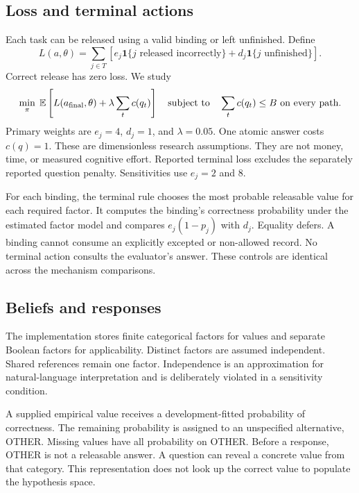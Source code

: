 \documentclass[11pt]{article}
\begin{document}
\subsection{Loss and terminal actions}
Each task can be released using a valid binding or left unfinished. Define
\begin{equation}
L(a,\theta)=\sum_{j\in T}\left[e_j\mathbf{1}\{j\text{ released incorrectly}\}+d_j\mathbf{1}\{j\text{ unfinished}\}\right].
\end{equation}
Correct release has zero loss. We study
\begin{equation}
\min_\pi\;\mathbb{E}\left[L(a_{\rm final},\theta)+\lambda\sum_t c(q_t)\right]
\quad\text{subject to}\quad\sum_t c(q_t)\leq B\text{ on every path}.
\end{equation}
Primary weights are $e_j=4$, $d_j=1$, and $\lambda=0.05$. One atomic answer costs $c(q)=1$. These are dimensionless research assumptions. They are not money, time, or measured cognitive effort. Reported terminal loss excludes the separately reported question penalty. Sensitivities use $e_j=2$ and $8$.

For each binding, the terminal rule chooses the most probable releasable value for each required factor. It computes the binding's correctness probability under the estimated factor model and compares $e_j(1-p_j)$ with $d_j$. Equality defers. A binding cannot consume an explicitly excepted or non-allowed record. No terminal action consults the evaluator's answer. These controls are identical across the mechanism comparisons.

\subsection{Beliefs and responses}
The implementation stores finite categorical factors for values and separate Boolean factors for applicability. Distinct factors are assumed independent. Shared references remain one factor. Independence is an approximation for natural-language interpretation and is deliberately violated in a sensitivity condition.

A supplied empirical value receives a development-fitted probability of correctness. The remaining probability is assigned to an unspecified alternative, OTHER. Missing values have all probability on OTHER. Before a response, OTHER is not a releasable answer. A question can reveal a concrete value from that category. This representation does not look up the correct value to populate the hypothesis space.
\end{document}
